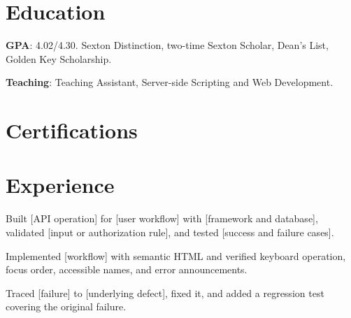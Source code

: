 \documentclass{resume}
\begin{document}

\section{Education}

\begin{jobduties}
  \item \textbf{GPA}: 4.02/4.30. Sexton Distinction, two-time Sexton Scholar, Dean's List, Golden Key Scholarship.
  \item \textbf{Teaching}: Teaching Assistant, Server-side Scripting and Web Development.
\end{jobduties}


\section{Certifications}


\section{Experience}

\begin{jobduties}
  \item Built [API operation] for [user workflow] with [framework and database], validated [input or authorization rule], and tested [success and failure cases].
  \item Implemented [workflow] with semantic HTML and verified keyboard operation, focus order, accessible names, and error announcements.
  \item Traced [failure] to [underlying defect], fixed it, and added a regression test covering the original failure.
\end{jobduties}
\end{document}
